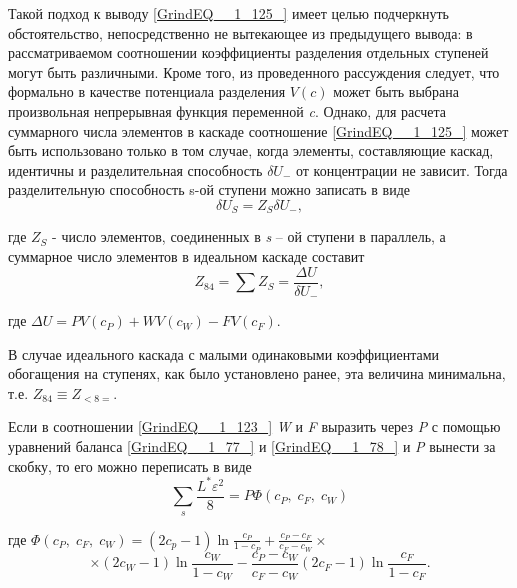 Такой подход к выводу \ref{GrindEQ__1_125_} имеет целью подчеркнуть обстоятельство, непосредственно не вытекающее из предыдущего вывода: в рассматриваемом соотношении коэффициенты разделения отдельных ступеней могут быть различными. Кроме того, из проведенного рассуждения следует, что формально в качестве потенциала разделения $V(c)$ может быть выбрана произвольная непрерывная функция переменной \textit{c}. Однако, для расчета суммарного числа элементов в каскаде соотношение \ref{GrindEQ__1_125_} может быть использовано только в том случае, когда элементы, составляющие каскад, идентичны и разделительная способность $\delta U_{-} $ от концентрации не зависит. Тогда разделительную способность s-ой ступени можно записать в виде
\begin{equation} \label{GrindEQ__1_126_} 
\delta U_{{S}} =Z_{S} \delta U_{-} ,                                       
\end{equation} 

где $Z_{S} $ - число элементов, соединенных в \textit{s} -- ой ступени в параллель, а суммарное число элементов в идеальном каскаде составит
\begin{equation} \label{GrindEQ__1_127_} 
Z_{84} =\sum Z_{S} =\frac{\Delta U}{\delta U_{-} }  ,                                
\end{equation} 

где  $\Delta U=PV(c_{P} )+WV(c_{W} )-FV(c_{F} )$.\label{GrindEQ__1_128_}

В случае идеального каскада с малыми одинаковыми коэффициентами обогащения на ступенях, как было установлено ранее, эта величина минимальна, т.е. $Z_{84} \equiv Z_{<8=} $.

Если в соотношении \ref{GrindEQ__1_123_} \textit{W} и \textit{F} выразить через \textit{P} с помощью уравнений баланса \ref{GrindEQ__1_77_} и \ref{GrindEQ__1_78_} и \textit{P} вынести за скобку, то его можно переписать в виде
\begin{equation} \label{GrindEQ__1_129_} 
\sum _{s}\frac{L^{*} \varepsilon ^{2} }{8}  =P\Phi (c_{P} ,\; c_{F} ,\; c_{W} ) 
\end{equation} 

где  $\Phi (c_{P} ,\; c_{F} ,\; c_{W} )=(2c_{p} -1)\ln \frac{c_{P} }{1-c_{P} } +\frac{c_{P} -c_{F} }{c_{F} -c_{W} } \times $
\begin{equation} \label{GrindEQ__1_130_} 
\times (2c_{W} -1)\ln \frac{c_{W} }{1-c_{W} } -\frac{c_{P} -c_{W} }{c_{F} -c_{W} } (2c_{F} -1)\ln \frac{c_{F} }{1-c_{F} } .              
\end{equation} 


